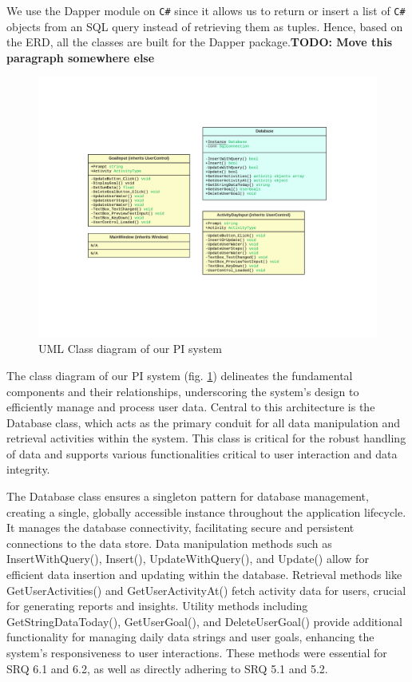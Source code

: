 \documentclass[12pt]{article}
\begin{document}
We use the Dapper module on \texttt{C\#} since it allows us to return or insert a
list of \texttt{C\#} objects from an SQL query instead of retrieving them as
tuples. Hence, based on the ERD, all the classes are built for the Dapper
package.\textbf{TODO: Move this paragraph somewhere else}\par

\begin{figure}[!ht]
  \centering
  \includegraphics[width = 0.7\linewidth]{UML Class diagram}
  \caption{UML Class diagram of our PI system}
  \label{fig:Class}
\end{figure}

The class diagram of our PI system (fig. \ref{fig:Class}) delineates the
fundamental components and their relationships, underscoring the system's
design to efficiently manage and process user data. Central to this
architecture is the Database class, which acts as the primary conduit for all
data manipulation and retrieval activities within the system. This class is
critical for the robust handling of data and supports various functionalities
critical to user interaction and data integrity.\par

The Database class ensures a singleton pattern for database management,
creating a single, globally accessible instance throughout the application
lifecycle. It manages the database connectivity, facilitating secure and
persistent connections to the data store. Data manipulation methods such as
InsertWithQuery(), Insert(), UpdateWithQuery(), and Update() allow for
efficient data insertion and updating within the database. Retrieval methods
like GetUserActivities() and GetUserActivityAt() fetch activity data for users,
crucial for generating reports and insights. Utility methods including
GetStringDataToday(), GetUserGoal(), and DeleteUserGoal() provide additional
functionality for managing daily data strings and user goals, enhancing the
system’s responsiveness to user interactions. These methods were essential for
SRQ 6.1 and 6.2, as well as directly adhering to SRQ 5.1 and 5.2. \par
\end{document}
